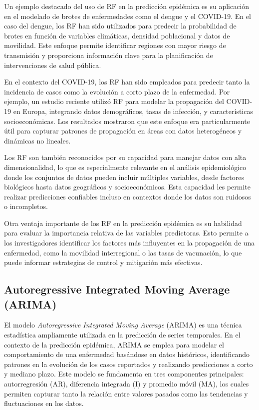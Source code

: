 Un ejemplo destacado del uso de RF en la predicción epidémica es su aplicación en el modelado de brotes de enfermedades como el dengue y el COVID-19. En el caso del dengue, los RF han sido utilizados para predecir la probabilidad de brotes en función de variables climáticas, densidad poblacional y datos de movilidad. Este enfoque permite identificar regiones con mayor riesgo de transmisión y proporciona información clave para la planificación de intervenciones de salud pública\parencite{Nguyen2023NZSTGNN, Baccega2024Sybil}.

En el contexto del COVID-19, los RF han sido empleados para predecir tanto la incidencia de casos como la evolución a corto plazo de la enfermedad. Por ejemplo, un estudio reciente utilizó RF para modelar la propagación del COVID-19 en Europa, integrando datos demográficos, tasas de infección, y características socioeconómicas. Los resultados mostraron que este enfoque era particularmente útil para capturar patrones de propagación en áreas con datos heterogéneos y dinámicas no lineales\parencite{Santangelo2023MachineLearning, Rodriguez2022DataCentric}.

Los RF son también reconocidos por su capacidad para manejar datos con alta dimensionalidad, lo que es especialmente relevante en el análisis epidemiológico donde los conjuntos de datos pueden incluir múltiples variables, desde factores biológicos hasta datos geográficos y socioeconómicos. Esta capacidad les permite realizar predicciones confiables incluso en contextos donde los datos son ruidosos o incompletos\parencite{Saleem2022MLDLModels}.

Otra ventaja importante de los RF en la predicción epidémica es su habilidad para evaluar la importancia relativa de las variables predictoras. Esto permite a los investigadores identificar los factores más influyentes en la propagación de una enfermedad, como la movilidad interregional o las tasas de vacunación, lo que puede informar estrategias de control y mitigación más efectivas\parencite{Rizzo2020AutoSEIR, Baccega2024Sybil}.

\subsection{Autoregressive Integrated Moving Average (ARIMA)}

El modelo \textit{Autoregressive Integrated Moving Average} (ARIMA) es una técnica estadística ampliamente utilizada en la predicción de series temporales. En el contexto de la predicción epidémica, ARIMA se emplea para modelar el comportamiento de una enfermedad basándose en datos históricos, identificando patrones en la evolución de los casos reportados y realizando predicciones a corto y mediano plazo. Este modelo se fundamenta en tres componentes principales: autorregresión (AR), diferencia integrada (I) y promedio móvil (MA), los cuales permiten capturar tanto la relación entre valores pasados como las tendencias y fluctuaciones en los datos\parencite{LimZohren2020TimeSeries, Datilo2019EpidemicForecasting}.

